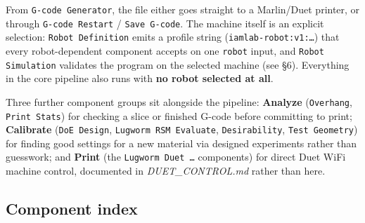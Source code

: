 \documentclass[11pt]{article}
\newcommand{\param}[1]{\texttt{#1}}
\begin{document}
From \param{G-code Generator}, the file either goes straight to a
Marlin/Duet printer, or through \param{G-code Restart} /
\param{Save G-code}. The machine itself is an explicit selection:
\param{Robot Definition} emits a profile string
(\texttt{iamlab-robot:v1:\ldots}) that every robot-dependent component
accepts on one \param{robot} input, and \param{Robot Simulation}
validates the program on the selected machine (see \S 6). Everything in
the core pipeline also runs with \textbf{no robot selected at all}.

Three further component groups sit alongside the pipeline:
\textbf{Analyze} (\param{Overhang}, \param{Print Stats})
for checking a slice or finished G-code before committing to print;
\textbf{Calibrate} (\param{DoE Design}, \param{Lugworm RSM
Evaluate}, \param{Desirability}, \param{Test Geometry})
for finding good settings for a new material via designed experiments
rather than guesswork; and \textbf{Print} (the \param{Lugworm Duet
\ldots} components) for direct Duet WiFi machine control, documented
in \emph{DUET\_CONTROL.md} rather than here.

\subsection{Component index}
\end{document}
